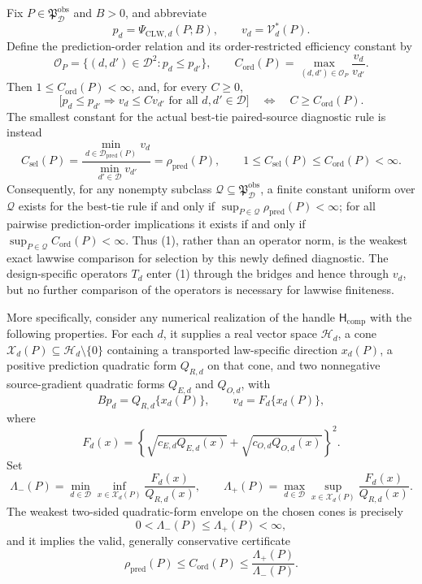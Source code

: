 Fix \(P\in\mathfrak P_{\mathcal D}^{\mathrm{obs}}\) and \(B>0\), and abbreviate
\[
 p_d=\Psi_{\mathrm{CLW},d}(P;B),
 \qquad
 v_d=\mathcal V_d^*(P).
\]
Define the prediction-order relation and its order-restricted efficiency constant by
\[
 \mathcal O_P
 =\{(d,d')\in\mathcal D^2:p_d\le p_{d'}\},
 \qquad
 C_{\mathrm{ord}}(P)
 =\max_{(d,d')\in\mathcal O_P}\frac{v_d}{v_{d'}}.
 \tag{1}
\]
Then \(1\le C_{\mathrm{ord}}(P)<\infty\), and, for every \(C\ge0\),
\[
 \bigl[p_d\le p_{d'}\Longrightarrow v_d\le C v_{d'}
 \text{ for all }d,d'\in\mathcal D\bigr]
 \quad\Longleftrightarrow\quad
 C\ge C_{\mathrm{ord}}(P).
 \tag{2}
\]
The smallest constant for the actual best-tie paired-source diagnostic rule is instead
\[
 C_{\mathrm{sel}}(P)
 =\frac{\min_{d\in\mathcal D_{\mathrm{pred}}(P)}v_d}
 {\min_{d'\in\mathcal D}v_{d'}}
 =\rho_{\mathrm{pred}}(P),
 \qquad
 1\le C_{\mathrm{sel}}(P)\le C_{\mathrm{ord}}(P)<\infty.
 \tag{3}
\]
Consequently, for any nonempty subclass \(\mathcal Q\subseteq\mathfrak P_{\mathcal D}^{\mathrm{obs}}\), a finite constant uniform over \(\mathcal Q\) exists for the best-tie rule if and only if
\(\sup_{P\in\mathcal Q}\rho_{\mathrm{pred}}(P)<\infty\); for all pairwise prediction-order implications it exists if and only if
\(\sup_{P\in\mathcal Q}C_{\mathrm{ord}}(P)<\infty\).  Thus (1), rather than an operator norm, is the weakest exact lawwise comparison for selection by this newly defined diagnostic.  The design-specific operators \(T_d\) enter (1) through the bridges and hence through \(v_d\), but no further comparison of the operators is necessary for lawwise finiteness.

More specifically, consider any numerical realization of the handle \(\mathsf H_{\mathrm{comp}}\) with the following properties.  For each \(d\), it supplies a real vector space \(\mathcal H_d\), a cone \(\mathcal X_d(P)\subseteq\mathcal H_d\setminus\{0\}\) containing a transported law-specific direction \(x_d(P)\), a positive prediction quadratic form \(Q_{R,d}\) on that cone, and two nonnegative source-gradient quadratic forms \(Q_{E,d}\) and \(Q_{O,d}\), with
\[
 Bp_d=Q_{R,d}\{x_d(P)\},
 \qquad
 v_d=F_d\{x_d(P)\},
 \tag{4}
\]
where
\[
 F_d(x)
 =\left\{
 \sqrt{c_{E,d}Q_{E,d}(x)}
 +\sqrt{c_{O,d}Q_{O,d}(x)}
 \right\}^2.
 \tag{5}
\]
Set
\[
 \Lambda_-(P)
 =\min_{d\in\mathcal D}\inf_{x\in\mathcal X_d(P)}
 \frac{F_d(x)}{Q_{R,d}(x)},
 \qquad
 \Lambda_+(P)
 =\max_{d\in\mathcal D}\sup_{x\in\mathcal X_d(P)}
 \frac{F_d(x)}{Q_{R,d}(x)}.
 \tag{6}
\]
The weakest two-sided quadratic-form envelope on the chosen cones is precisely
\[
 0<\Lambda_-(P)\le\Lambda_+(P)<\infty,
 \tag{7}
\]
and it implies the valid, generally conservative certificate
\[
 \rho_{\mathrm{pred}}(P)
 \le C_{\mathrm{ord}}(P)
 \le\frac{\Lambda_+(P)}{\Lambda_-(P)}.
 \tag{8}
\]

